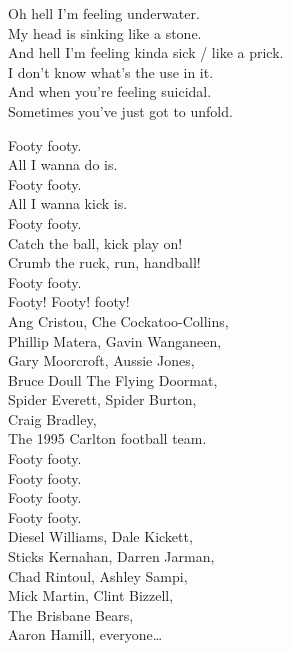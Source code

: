 

Oh hell I'm feeling underwater. \\
My head is sinking like a stone. \\

And hell I'm feeling kinda sick / like a prick. \\
I don't know what's the use in it. \\

And when you're feeling suicidal. \\
Sometimes you've just got to unfold. \\




Footy footy. \\
All I wanna do is. \\
Footy footy. \\
All I wanna kick is. \\
Footy footy. \\
Catch the ball, kick play on! \\
Crumb the ruck, run, handball! \\
Footy footy. \\
Footy! Footy! footy! \\

Ang Cristou, Che Cockatoo-Collins, \\
Phillip Matera, Gavin Wanganeen, \\
Gary Moorcroft, Aussie Jones, \\
Bruce Doull The Flying Doormat, \\
Spider Everett, Spider Burton, \\
Craig Bradley, \\
The 1995 Carlton football team. \\

Footy footy. \\
Footy footy. \\
Footy footy. \\
Footy footy. \\

Diesel Williams, Dale Kickett, \\
Sticks Kernahan, Darren Jarman, \\
Chad Rintoul, Ashley Sampi, \\
Mick Martin, Clint Bizzell, \\
The Brisbane Bears, \\
Aaron Hamill, everyone… \\

